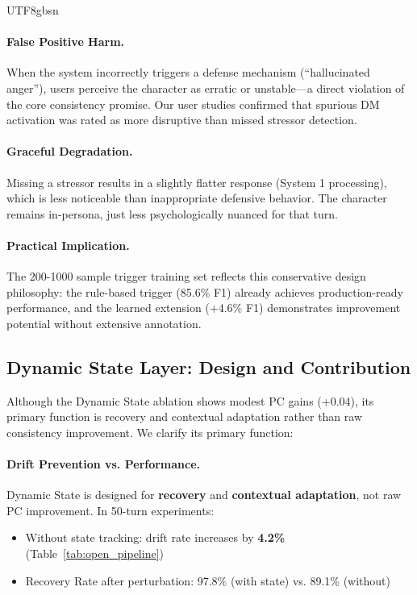 \documentclass[11pt]{article}
\begin{document}
\begin{CJK*}{UTF8}{gbsn}
\paragraph{False Positive Harm.} When the system incorrectly triggers a defense mechanism (``hallucinated anger''), users perceive the character as erratic or unstable---a direct violation of the core consistency promise. Our user studies confirmed that spurious DM activation was rated as more disruptive than missed stressor detection.

\paragraph{Graceful Degradation.} Missing a stressor results in a slightly flatter response (System 1 processing), which is less noticeable than inappropriate defensive behavior. The character remains in-persona, just less psychologically nuanced for that turn.

\paragraph{Practical Implication.} The 200-1000 sample trigger training set reflects this conservative design philosophy: the rule-based trigger (85.6\% F1) already achieves production-ready performance, and the learned extension (+4.6\% F1) demonstrates improvement potential without extensive annotation.

\subsection{Dynamic State Layer: Design and Contribution}
\label{sec:state_rationale}

Although the Dynamic State ablation shows modest PC gains (+0.04), its primary function is recovery and contextual adaptation rather than raw consistency improvement. We clarify its primary function:

\paragraph{Drift Prevention vs. Performance.} Dynamic State is designed for \textbf{recovery} and \textbf{contextual adaptation}, not raw PC improvement. In 50-turn experiments:
\begin{itemize}
    \item Without state tracking: drift rate increases by \textbf{4.2\%} (Table~\ref{tab:open_pipeline})
    \item Recovery Rate after perturbation: 97.8\% (with state) vs. 89.1\% (without)
\end{itemize}


\end{CJK*}
\end{document}
